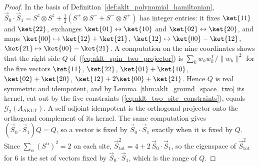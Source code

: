 \begin{proof}
    \leanok
    In the basis of Definition~\ref{def:aklt_polynomial_hamiltonian},
    $\vec S_0\cdot\vec S_1=S^z\otimes S^z+\tfrac12(S^+\otimes S^-+S^-\otimes S^+)$
    has integer entries: it fixes $\ket{11}$ and $\ket{22}$, exchanges
    $\ket{01}\leftrightarrow\ket{10}$ and $\ket{02}\leftrightarrow\ket{20}$, and
    maps $\ket{00}\mapsto\ket{12}+\ket{21}$, $\ket{12}\mapsto\ket{00}-\ket{12}$,
    $\ket{21}\mapsto\ket{00}-\ket{21}$. A computation on the nine coordinates
    shows that the right side $Q$ of~(\ref{eq:aklt_spin_two_projector}) is
    $\sum_kw_kw_k^{\mathsf T}/\lVert w_k\rVert^{2}$ for the five vectors
    $\ket{11}$, $\ket{22}$, $\ket{01}+\ket{10}$, $\ket{02}+\ket{20}$,
    $\ket{12}+2\ket{00}+\ket{21}$. Hence $Q$ is real symmetric and idempotent,
    and by Lemma~\ref{thm:aklt_ground_space_two} its kernel, cut out by the
    five constraints (\ref{eq:aklt_two_site_constraints}), equals
    $\mathcal G_2(A_{\mathrm{AKLT}})$. A self-adjoint idempotent is the
    orthogonal projector onto the orthogonal complement of its kernel. The same
    computation gives $(\vec S_0\cdot\vec S_1)Q=Q$, so a vector is fixed by
    $\vec S_0\cdot\vec S_1$ exactly when it is fixed by $Q$. Since
    $\sum_\alpha(S^\alpha)^{2}=2$ on each site,
    $\vec S_{\mathrm{tot}}^{2}=4+2\,\vec S_0\cdot\vec S_1$, so the eigenspace of
    $\vec S_{\mathrm{tot}}^{2}$ for $6$ is the set of vectors fixed by
    $\vec S_0\cdot\vec S_1$, which is the range of $Q$.
\end{proof}

